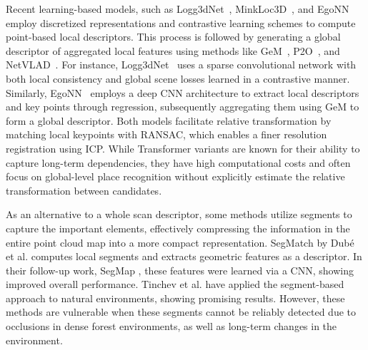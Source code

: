 Recent learning-based models, such as Logg3dNet~\cite{vidanapathirana2022icra}, MinkLoc3D~\cite{komorowski2021wacv}, and EgoNN~\cite{komorowski2022ral} employ discretized representations and contrastive learning schemes to compute point-based local descriptors. This process is followed by generating a global descriptor of aggregated local features using methods like GeM~\cite{radenovic2019pami}, P2O~\cite{vidanapathirana2021icra}, and NetVLAD~\cite{arandjelovic2018pami}.  
For instance, Logg3dNet~\cite{vidanapathirana2022icra} uses a sparse convolutional network with both local consistency and global scene losses learned in a contrastive manner. Similarly, EgoNN~\cite{komorowski2022ral} employs a deep CNN architecture to extract local descriptors and key points through regression, subsequently aggregating them using GeM to form a global descriptor.
Both models facilitate relative transformation by matching local keypoints with RANSAC, which enables a finer resolution registration using ICP. 
While Transformer variants \cite{zhang2019cvpr, xia2021cvpr, zhou2021icra, xu2021transloc3d} are known for their ability to capture long-term dependencies, they have high computational costs and  often focus on global-level place recognition without explicitly estimate the relative transformation between candidates. 

As an alternative to a whole scan descriptor, some methods utilize segments to capture the important elements, effectively compressing the information in the entire point cloud map into a more compact representation. SegMatch \cite{dube2017icra} by Dubé et al. computes local segments and extracts geometric features as a descriptor. In their follow-up work, SegMap \cite{dube2018rss}, these features were learned via a CNN, showing improved overall performance. Tinchev et al. \cite{tinchev2018iros, tinchev2019ral} have applied the segment-based approach to natural environments, showing promising results. However, these methods are vulnerable when these segments cannot be reliably detected due to occlusions in dense forest environments, as well as long-term changes in the environment.

